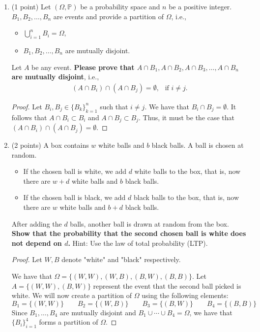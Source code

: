 \documentclass[11pt]{article}
\begin{document}
\begin{enumerate}
\item (1 point) Let $(\Omega,\mathbb{P})$ be a probability space and $n$ be a positive integer. $B_1, B_2,\ldots, B_n$ are events and provide a partition of $\Omega$, i.e.,
\begin{itemize}
    \item $\bigcup_{i=1}^n B_i=\Omega$,
    \item $B_1, B_2,\ldots, B_n$ are mutually disjoint.
\end{itemize}
Let $A$ be any event. \textbf{Please prove that $A\cap B_1, A\cap B_2, A\cap B_3,\ldots, A\cap B_n$ are mutually disjoint}, i.e.,
\begin{align*}
    (A\cap B_i)\cap (A\cap B_j)=\emptyset,\ \ \text{ if }i\ne j.
\end{align*}

\begin{proof}
  Let \(B_i,B_j\in\{B_k\}_{k=1}^n\) such that \(i\neq j\). We have that \(B_i\cap B_j=\emptyset\).
  It follows that \(A\cap B_i\subset B_i\) and \(A\cap B_j\subset B_j\). Thus, it must be the case that
  \((A\cap B_i)\cap(A\cap B_j)=\emptyset\).
\end{proof}

\item (2 points) A box contains $w$ white balls and $b$ black balls.  A ball is chosen at random. 
\begin{itemize}
\item If the chosen ball is white, we add $d$ white balls to the box, that is, now there are $w+d$ white balls and $b$ black balls.
\item If the chosen ball is black, we add $d$ black balls to the box, that is, now there are $w$ white balls and $b+d$ black balls. 
\end{itemize}
After adding the $d$ balls, another ball is drawn at random from the box.  \textbf{Show that the probability that the second chosen ball is white does not depend on $d$.} Hint: Use the law of total probability (LTP).

\begin{proof}
  Let \(W,B\) denote "white" and "black" respectively. 
  
  We have that \(\Omega=\{(W,W),(W,B),(B,W),(B,B)\}\). Let \(A =\{(W, W),(B, W)\}\) represent the event that the second ball picked is white.
  We will now create a partition of \(\Omega\) using the following elements:
  \[B_1=\{(W,W)\}\quad\quad B_2=\{(W,B)\}\quad\quad B_3=\{(B,W)\}\quad\quad B_4=\{(B,B)\}\]
  Since \(B_1,\ldots,B_4\) are mutually disjoint and \(B_1\cup\cdots\cup B_4=\Omega\), we have that
  \(\{B_i\}_{i=1}^4\) forms a partition of \(\Omega\).


\end{proof}
\end{enumerate}
\end{document}
